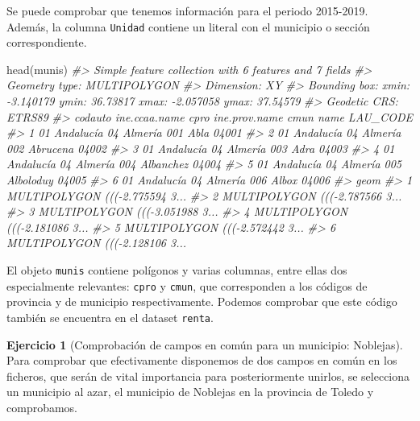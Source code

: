 \documentclass[
]{book}
\newenvironment{Shaded}{\begin{snugshade}}{\end{snugshade}}
\newcommand{\CommentTok}[1]{\textcolor[rgb]{0.56,0.35,0.01}{\textit{#1}}}
\newcommand{\FunctionTok}[1]{\textcolor[rgb]{0.00,0.00,0.00}{#1}}
\newcommand{\NormalTok}[1]{#1}
\theoremstyle{definition}
\theoremstyle{definition}
\theoremstyle{definition}
\newtheorem{exercise}{Ejercicio}[chapter]
\theoremstyle{definition}
\theoremstyle{remark}
\begin{document}
Se puede comprobar que tenemos información para el periodo 2015-2019. Además, la
columna \texttt{Unidad} contiene un literal con el municipio o sección correspondiente.

\begin{Shaded}
\begin{Highlighting}[]
\FunctionTok{head}\NormalTok{(munis)}
\CommentTok{\#\textgreater{} Simple feature collection with 6 features and 7 fields}
\CommentTok{\#\textgreater{} Geometry type: MULTIPOLYGON}
\CommentTok{\#\textgreater{} Dimension:     XY}
\CommentTok{\#\textgreater{} Bounding box:  xmin: {-}3.140179 ymin: 36.73817 xmax: {-}2.057058 ymax: 37.54579}
\CommentTok{\#\textgreater{} Geodetic CRS:  ETRS89}
\CommentTok{\#\textgreater{}   codauto ine.ccaa.name cpro ine.prov.name cmun      name LAU\_CODE}
\CommentTok{\#\textgreater{} 1      01     Andalucía   04       Almería  001      Abla    04001}
\CommentTok{\#\textgreater{} 2      01     Andalucía   04       Almería  002  Abrucena    04002}
\CommentTok{\#\textgreater{} 3      01     Andalucía   04       Almería  003      Adra    04003}
\CommentTok{\#\textgreater{} 4      01     Andalucía   04       Almería  004 Albanchez    04004}
\CommentTok{\#\textgreater{} 5      01     Andalucía   04       Almería  005 Alboloduy    04005}
\CommentTok{\#\textgreater{} 6      01     Andalucía   04       Almería  006     Albox    04006}
\CommentTok{\#\textgreater{}                             geom}
\CommentTok{\#\textgreater{} 1 MULTIPOLYGON ((({-}2.775594 3...}
\CommentTok{\#\textgreater{} 2 MULTIPOLYGON ((({-}2.787566 3...}
\CommentTok{\#\textgreater{} 3 MULTIPOLYGON ((({-}3.051988 3...}
\CommentTok{\#\textgreater{} 4 MULTIPOLYGON ((({-}2.181086 3...}
\CommentTok{\#\textgreater{} 5 MULTIPOLYGON ((({-}2.572442 3...}
\CommentTok{\#\textgreater{} 6 MULTIPOLYGON ((({-}2.128106 3...}
\end{Highlighting}
\end{Shaded}

El objeto \texttt{munis} contiene polígonos y varias columnas, entre ellas dos
especialmente relevantes: \texttt{cpro} y \texttt{cmun}, que corresponden a los códigos de
provincia y de municipio respectivamente. Podemos comprobar que este código
también se encuentra en el dataset \texttt{renta}.

\begin{exercise}[Comprobación de campos en común para un municipio: Noblejas]
\protect\hypertarget{exr:ex17}{}\label{exr:ex17}Para comprobar que efectivamente disponemos de dos campos en común en los
ficheros, que serán de vital importancia para posteriormente unirlos, se
selecciona un municipio al azar, el municipio de Noblejas en la provincia de
Toledo y comprobamos.
\end{exercise}
\end{document}
